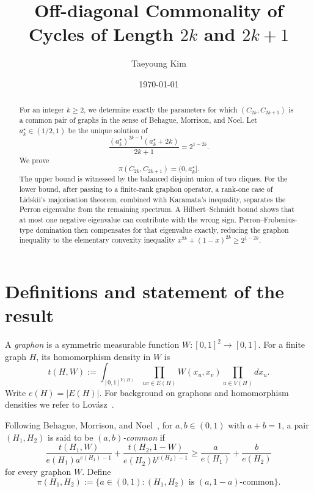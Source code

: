 \documentclass[11pt]{article}
\title{Off-diagonal Commonality of Cycles of Length
\texorpdfstring{$2k$}{2k} and \texorpdfstring{$2k+1$}{2k+1}}
\author{Taeyoung Kim}
\date{\today}
\theoremstyle{definition}
\theoremstyle{remark}
\begin{document}
\maketitle

\begin{abstract}
For an integer $k\ge 2$, we determine exactly the parameters for which
$(C_{2k},C_{2k+1})$ is a common pair of graphs in the sense of Behague,
Morrison, and Noel.  Let $a_k^\star\in(1/2,1)$ be the
unique solution of
\[
  \frac{(a_k^\star)^{2k-1}(a_k^\star+2k)}{2k+1}=2^{1-2k}.
\]
We prove
\[
  \pi(C_{2k},C_{2k+1})=(0,a_k^\star].
\]
The upper bound is witnessed by the balanced disjoint union of two cliques.  For
the lower bound, after passing to a finite-rank graphon operator, a rank-one
case of Lidskii's majorisation theorem, combined with Karamata's inequality,
separates the Perron eigenvalue from the remaining spectrum.  A
Hilbert--Schmidt bound shows that at most one negative eigenvalue can
contribute with the wrong sign.  Perron--Frobenius-type domination then
compensates for that eigenvalue exactly, reducing the graphon inequality to
the elementary convexity inequality $x^{2k}+(1-x)^{2k}\ge 2^{1-2k}$.
\end{abstract}

\section{Definitions and statement of the result}

A \emph{graphon} is a symmetric measurable function
$W\colon[0,1]^2\to[0,1]$.  For a finite graph $H$, its homomorphism density in
$W$ is
\[
  t(H,W)
  :=
  \int_{[0,1]^{V(H)}}
  \prod_{uv\in E(H)} W(x_u,x_v)
  \prod_{u\in V(H)}dx_u.
\]
Write $e(H)=|E(H)|$.  For background on graphons and homomorphism densities
we refer to Lov\'asz~\cite{Lovasz}.

Following Behague, Morrison, and Noel~\cite[Definition~1.1]{BMN}, for
$a,b\in(0,1)$ with
$a+b=1$, a pair $(H_1,H_2)$ is said to be \emph{$(a,b)$-common} if
\begin{equation}
  \frac{t(H_1,W)}{e(H_1)a^{e(H_1)-1}}
  +
  \frac{t(H_2,1-W)}{e(H_2)b^{e(H_2)-1}}
  \ge
  \frac{a}{e(H_1)}+\frac{b}{e(H_2)}
  \label{eq:common-definition}
\end{equation}
for every graphon $W$.  Define
\[
  \pi(H_1,H_2)
  :=
  \{a\in(0,1):(H_1,H_2)\text{ is }(a,1-a)\text{-common}\}.
\]
\end{document}
